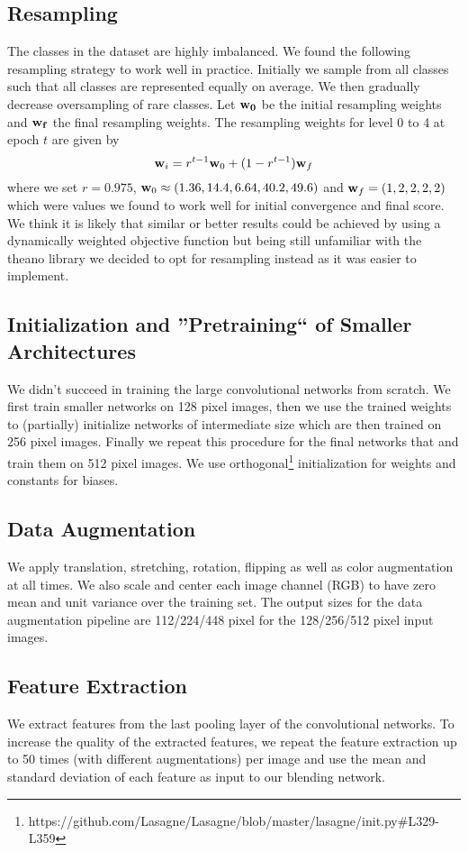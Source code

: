 \documentclass[12pt,a4paper]{scrartcl}
\begin{document}
\subsection{Resampling}
The classes in the dataset are highly imbalanced. We found the following resampling strategy to work well in practice. Initially we sample from all classes such that all classes are represented equally on average. We then gradually decrease oversampling of rare classes. Let ${\bf w_0}$ be the initial resampling weights and ${\bf w_f}$ the final resampling weights. The resampling weights for level 0 to 4 at epoch $t$ are given by
\begin{equation}
{\bf w}_i = r^{t-1} {\bf w}_0 + (1 - r^{t-1}) {\bf w}_f
\end{equation}
where we set $r=0.975$, ${\bf w}_0 \approx (1.36, 14.4, 6.64, 40.2, 49.6)$ and ${\bf w}_f = (1, 2, 2, 2, 2)$ which were values we found to work well for initial convergence and final score. We think it is likely that similar or better results could be achieved by using a dynamically weighted objective function but being still unfamiliar with the theano library we decided to opt for resampling instead as it was easier to implement.
\subsection{Initialization and ''Pretraining`` of Smaller Architectures}
We didn't succeed in training the large convolutional networks from scratch. We first train smaller networks on 128 pixel images, then we use the trained weights to (partially) initialize networks of intermediate size which are then trained on 256 pixel images. Finally we repeat this procedure for the final networks that and train them on 512 pixel images. We use orthogonal\footnote{https://github.com/Lasagne/Lasagne/blob/master/lasagne/init.py\#L329-L359} initialization for weights and constants for biases.
\subsection{Data Augmentation}
We apply translation, stretching, rotation, flipping as well as color augmentation at all times. We also scale and center each image channel (RGB) to have zero mean and unit variance over the training set. The output sizes for the data augmentation pipeline are 112/224/448 pixel for the 128/256/512 pixel input images. 
\subsection{Feature Extraction}
We extract features from the last pooling layer of the convolutional networks. To increase the quality of the extracted features, we repeat the feature extraction up to 50 times (with different augmentations) per image and use the mean and standard deviation of each feature as input to our blending network.
\end{document}
